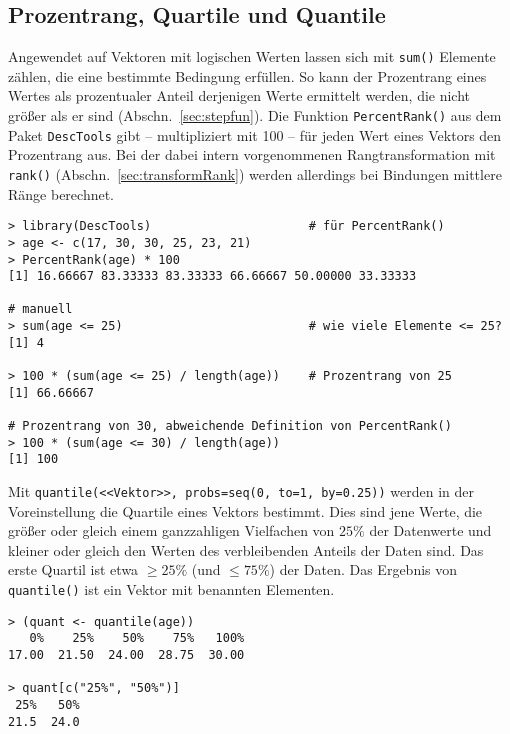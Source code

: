 \subsection{Prozentrang, Quartile und Quantile}
\label{sec:quantile}

Angewendet auf Vektoren mit logischen Werten lassen sich mit \lstinline!sum()! Elemente zählen, die eine bestimmte Bedingung erfüllen. So kann der Prozentrang eines Wertes als prozentualer Anteil derjenigen Werte ermittelt werden, die nicht größer als er sind (Abschn.\ \ref{sec:stepfun}). Die Funktion \lstinline!PercentRank()! aus dem Paket \lstinline!DescTools! gibt -- multipliziert mit 100 -- für jeden Wert eines Vektors den Prozentrang aus. Bei der dabei intern vorgenommenen Rangtransformation mit \lstinline!rank()! (Abschn.\ \ref{sec:transformRank}) werden allerdings bei Bindungen mittlere Ränge berechnet.
\begin{lstlisting}
> library(DescTools)                      # für PercentRank()
> age <- c(17, 30, 30, 25, 23, 21)
> PercentRank(age) * 100
[1] 16.66667 83.33333 83.33333 66.66667 50.00000 33.33333

# manuell
> sum(age <= 25)                          # wie viele Elemente <= 25?
[1] 4

> 100 * (sum(age <= 25) / length(age))    # Prozentrang von 25
[1] 66.66667

# Prozentrang von 30, abweichende Definition von PercentRank()
> 100 * (sum(age <= 30) / length(age))
[1] 100
\end{lstlisting}

Mit \lstinline!quantile(<<Vektor>>, probs=seq(0, to=1, by=0.25))! werden in der Voreinstellung die Quartile eines Vektors bestimmt. Dies sind jene Werte, die größer oder gleich einem ganzzahligen Vielfachen von $25\%$ der Datenwerte und kleiner oder gleich den Werten des verbleibenden Anteils der Daten sind. Das erste Quartil ist etwa $\geq 25\%$ (und $\leq 75\%$) der Daten. Das Ergebnis von \lstinline!quantile()! ist ein Vektor mit benannten Elementen.
\begin{lstlisting}
> (quant <- quantile(age))
   0%    25%    50%    75%   100%
17.00  21.50  24.00  28.75  30.00

> quant[c("25%", "50%")]
 25%   50%
21.5  24.0
\end{lstlisting}

